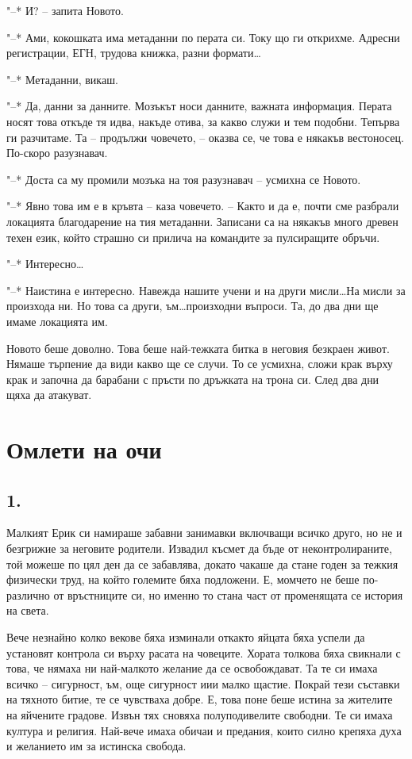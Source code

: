 \documentclass[ebook,openany,12pt]{memoir}
\begin{document}
"--* И? – запита Новото.

"--* Ами, кокошката има метаданни по перата си. Току що ги открихме. Адресни регистрации, ЕГН, трудова книжка, разни формати\ldots

"--* Метаданни, викаш.

"--* Да, данни за данните. Мозъкът носи данните, важната информация. Перата носят това откъде тя идва, накъде отива, за какво служи и тем подобни. Тепърва ги разчитаме. Та -- продължи човечето, – оказва се, че това е някакъв вестоносец. По-скоро разузнавач.

"--* Доста са му промили мозъка на тоя разузнавач – усмихна се Новото.

"--* Явно това им е в кръвта – каза човечето. – Както и да е, почти сме разбрали локацията благодарение на тия метаданни. Записани са на някакъв много древен техен език, който страшно си прилича на командите за пулсиращите обръчи.

"--* Интересно\ldots

"--* Наистина е интересно. Навежда нашите учени и на други мисли\ldots На мисли за произхода ни. Но това са други, ъм\ldots произходни въпроси. Та, до два дни ще имаме локацията им.

Новото беше доволно. Това беше най-тежката битка в неговия безкраен живот. Нямаше търпение да види какво ще се случи. То се усмихна, сложи крак върху крак и започна да барабани с пръсти по дръжката на трона си. След два дни щяха да атакуват.

\chapter{Омлети на очи}

\section*{1.}

Малкият Ерик си намираше забавни занимавки вкл\-ючващи всичко друго, но не и безгрижие за неговите родители. Извадил късмет да бъде от неконтролираните, той можеше по цял ден да се забавлява, докато чакаше да стане годен за тежкия физически труд, на който големите бяха подложени. Е, момчето не беше по-различно от връстниците си, но именно то стана част от променящата се история на света.

Вече незнайно колко векове бяха изминали откакто яйцата бяха успели да установят контрола си върху расата на човеците. Хората толкова бяха свикнали с това, че нямаха ни най-малкото желание да се освобождават. Та те си имаха всичко – сигурност, ъм, още сигурност иии малко щастие. Покрай тези съставки на тяхното битие, те се чувстваха добре. Е, това поне беше истина за жителите на яйчените градове. Извън тях сновяха полуподивелите свободни. Те си имаха култура и религия. Най-вече имаха обичаи и предания, които силно крепяха духа и желанието им за истинска свобода.
\end{document}
